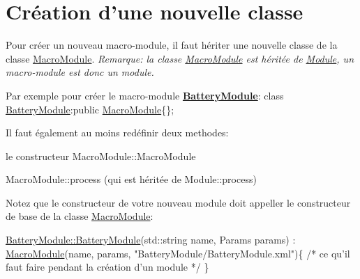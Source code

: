 \hypertarget{docModule_classCreation}{}\section{Création d'une nouvelle classe}\label{docModule_classCreation}
Pour créer un nouveau macro-\/module, il faut hériter une nouvelle classe de la classe \hyperlink{classMacroModule}{Macro\-Module}. {\itshape Remarque\-: la classe \hyperlink{classMacroModule}{Macro\-Module} est héritée de \hyperlink{classModule}{Module}, un macro-\/module est donc un module.}

Par exemple pour créer le macro-\/module {\bfseries \hyperlink{classBatteryModule}{Battery\-Module}}\-: {\ttfamily class \hyperlink{classBatteryModule}{Battery\-Module}\-:public \hyperlink{classMacroModule}{Macro\-Module}\{\};}

Il faut également au moins redéfinir deux methodes\-:
\begin{DoxyEnumerate}
\item le constructeur Macro\-Module\-::\-Macro\-Module
\item Macro\-Module\-::process (qui est héritée de Module\-::process)
\end{DoxyEnumerate}

Notez que le constructeur de votre nouveau module doit appeller le constructeur de base de la classe \hyperlink{classMacroModule}{Macro\-Module}\-:


\begin{DoxyCode}
\hyperlink{classBatteryModule_a2fb494ef5f124c38c0fdf9ccfb31918f}{BatteryModule::BatteryModule}(std::string name, Params params) : 
      \hyperlink{classMacroModule}{MacroModule}(name, params, \textcolor{stringliteral}{"BatteryModule/BatteryModule.xml"})\{
    \textcolor{comment}{/* ce qu'il faut faire pendant la création d'un module */}
\}
\end{DoxyCode}


